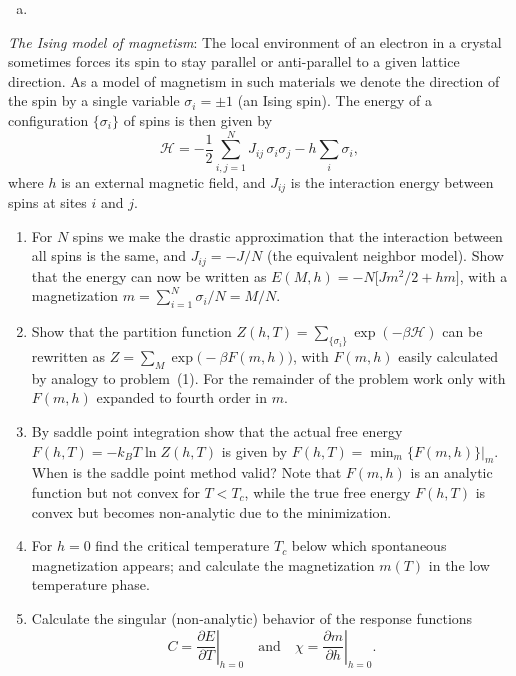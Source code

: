 \begin{solution}
    \begin{enumerate}[(a)]
        \item
    \end{enumerate}
\end{solution}

\begin{problem}
    \textit{The Ising model of magnetism}: The local environment of an electron in a crystal sometimes forces its spin to stay parallel or anti-parallel to a given lattice direction. As a model of magnetism in such materials we denote the direction of the spin by a single variable $\sigma_i = \pm 1$ (an Ising spin). The energy of a configuration $\{\sigma_i\}$ of spins is then given by
    \[
        \mathcal{H} = -\frac{1}{2}\sum_{i,j=1}^{N} J_{ij}\,\sigma_i\sigma_j - h\sum_i \sigma_i,
    \]
    where $h$ is an external magnetic field, and $J_{ij}$ is the interaction energy between spins at sites $i$ and $j$.

    \begin{enumerate}
        \item[(a)] For $N$ spins we make the drastic approximation that the interaction between all spins is the same, and $J_{ij} = -J/N$ (the equivalent neighbor model). Show that the energy can now be written as $E(M,h) = -N\bigl[Jm^2/2 + hm\bigr]$, with a magnetization $m = \sum_{i=1}^N \sigma_i/N = M/N$.

        \item[(b)] Show that the partition function $Z(h,T) = \sum_{\{\sigma_i\}} \exp(-\beta\mathcal{H})$ can be rewritten as $Z = \sum_M \exp\!\bigl(-\beta F(m,h)\bigr)$, with $F(m,h)$ easily calculated by analogy to problem~(1). For the remainder of the problem work only with $F(m,h)$ expanded to fourth order in $m$.

        \item[(c)] By saddle point integration show that the actual free energy $F(h,T) = -k_BT\ln Z(h,T)$ is given by $F(h,T) = \min_m\{F(m,h)\}|_m$. When is the saddle point method valid? Note that $F(m,h)$ is an analytic function but not convex for $T < T_c$, while the true free energy $F(h,T)$ is convex but becomes non-analytic due to the minimization.

        \item[(d)] For $h = 0$ find the critical temperature $T_c$ below which spontaneous magnetization appears; and calculate the magnetization $m(T)$ in the low temperature phase.

        \item[(e)] Calculate the singular (non-analytic) behavior of the response functions
        \[
            C = \left.\frac{\partial E}{\partial T}\right|_{h=0} \quad \text{and} \quad \chi = \left.\frac{\partial m}{\partial h}\right|_{h=0}.
        \]
    \end{enumerate}
\end{problem}

